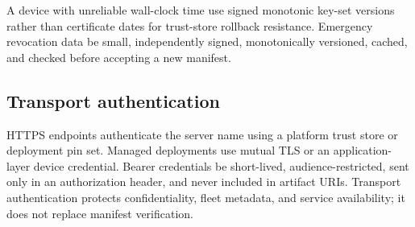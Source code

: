 A device with unreliable wall-clock time \must use signed monotonic key-set
versions rather than certificate dates for trust-store rollback resistance.
Emergency revocation data \should be small, independently signed, monotonically
versioned, cached, and checked before accepting a new manifest.

\subsection{Transport authentication}

HTTPS endpoints \must authenticate the server name using a platform trust store
or deployment pin set. Managed deployments \should use mutual TLS or an
application-layer device credential. Bearer credentials \must be short-lived,
audience-restricted, sent only in an authorization header, and never included in
artifact URIs. Transport authentication protects confidentiality, fleet metadata,
and service availability; it does not replace manifest verification.

